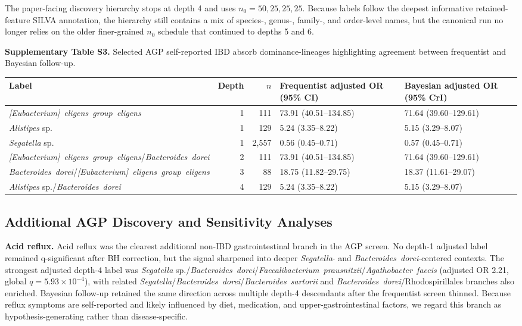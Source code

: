 \documentclass[11pt]{article}
\newcommand{\taxon}[1]{\emph{#1}}
\newcommand{\dcstsep}{/\allowbreak}
\begin{document}
\noindent The paper-facing discovery hierarchy stops at depth 4 and uses
\(n_0 = 50, 25, 25, 25\). Because labels follow the deepest informative
retained-feature SILVA annotation, the hierarchy still contains a mix of
species-, genus-, family-, and order-level names, but the canonical
run no longer relies on the older finer-grained \(n_0\) schedule that
continued to depths 5 and 6.

\bigskip

\noindent\textbf{Supplementary Table S3.} Selected AGP self-reported
IBD absorb dominance-lineages highlighting agreement between
frequentist and Bayesian follow-up.

\begin{center}
\footnotesize
\begin{tabularx}{\textwidth}{@{} Y r r Y Y @{}}
\toprule
Label & Depth & \(n\) & Frequentist adjusted OR (95\% CI) & Bayesian adjusted OR (95\% CrI) \\
\midrule
\taxon{[Eubacterium]~eligens~group~eligens} & 1 & 111 & 73.91 (40.51--134.85) & 71.64 (39.60--129.61) \\
\taxon{Alistipes} sp. & 1 & 129 & 5.24 (3.35--8.22) & 5.15 (3.29--8.07) \\
\taxon{Segatella} sp. & 1 & 2,557 & 0.56 (0.45--0.71) & 0.57 (0.45--0.71) \\
\taxon{[Eubacterium]~eligens~group~eligens}\dcstsep\taxon{Bacteroides~dorei} & 2 & 111 & 73.91 (40.51--134.85) & 71.64 (39.60--129.61) \\
\taxon{Bacteroides~dorei}\dcstsep\taxon{[Eubacterium]~eligens~group~eligens} & 3 & 88 & 18.75 (11.82--29.75) & 18.37 (11.61--29.07) \\
\taxon{Alistipes} sp.\dcstsep\taxon{Bacteroides~dorei} & 4 & 129 & 5.24 (3.35--8.22) & 5.15 (3.29--8.07) \\
\bottomrule
\end{tabularx}
\end{center}

\subsection*{Additional AGP Discovery and Sensitivity Analyses}

\noindent\textbf{Acid reflux.} Acid reflux was the clearest additional
non-IBD gastrointestinal branch in the AGP screen. No depth-1 adjusted
label remained q-significant after BH correction, but the signal
sharpened into deeper \taxon{Segatella}- and
\taxon{Bacteroides~dorei}-centered contexts. The strongest adjusted
depth-4 label was
\taxon{Segatella} sp.\dcstsep\taxon{Bacteroides~dorei}\dcstsep\taxon{Faecalibacterium~prausnitzii}\dcstsep\taxon{Agathobacter~faecis}
(adjusted OR 2.21, global \(q = 5.93\times10^{-4}\)), with related
\taxon{Segatella}/\taxon{Bacteroides~dorei}/\taxon{Bacteroides~sartorii}
and \taxon{Bacteroides~dorei}/Rhodospirillales branches also enriched.
Bayesian follow-up retained the same direction across multiple depth-4
descendants after the frequentist screen thinned.
Because reflux symptoms are self-reported and likely influenced by diet,
medication, and upper-gastrointestinal factors, we regard this branch as
hypothesis-generating rather than disease-specific.
\end{document}
